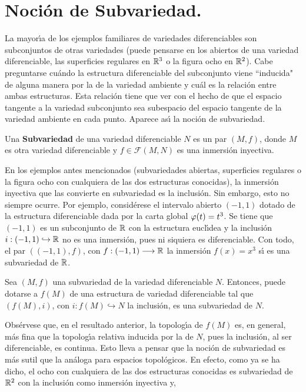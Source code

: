 \documentclass[cursovd_portada.tex]{subfiles}
\begin{document}
\section{Noci\'{o}n de Subvariedad.}
\hs La mayor\'{\i}a de los ejemplos familiares de variedades
diferenciables son subconjuntos de otras variedades (puede
pensarse en los abiertos de una variedad diferenciable, las
superficies re\-gu\-la\-res en $\mathbb{R}^3$ o la figura ocho en $\mathbb{R}^2$).
Cabe preguntarse cu\'{a}ndo la estructura diferenciable del
subconjunto viene ``inducida" de alguna manera por la de la
variedad ambiente y cu\'{a}l es la relaci\'{o}n entre ambas
estructuras. Esta relaci\'{o}n tiene que ver con el hecho de que
el espacio tangente a la variedad subconjunto sea subespacio del
espacio tangente de la variedad ambiente en cada punto. Aparece
as\'{\i} la noci\'{o}n de subvariedad.
\begin{defi}
Una {\bf Subvariedad} de una variedad diferenciable $N$ es un par $(M,f)$, donde $M$ es otra variedad
diferenciable y $f\in\mathcal{F}(M,N)$ es una inmersi\'{o}n inyectiva.
\end{defi}
En los ejemplos antes mencionados (subvariedades abiertas,
superficies re\-gu\-la\-res o la figura ocho con cualquiera de las
dos estructuras conocidas), la inmersi\'{o}n inyectiva que las
convierte en subvariedad es la inclusi\'{o}n. Sin embargo, esto no
siempre ocurre. Por ejemplo, consid\'{e}rese el intervalo abierto
$(-1,1)$ dotado de la estructura diferenciable dada por la carta
global $\varphi(t)=t^3$. Se tiene que $(-1,1)$ es un subconjunto de
$\mathbb{R}$ con la estructura eucl\'{\i}dea y la inclusi\'{o}n
$i:(-1,1)\hookrightarrow\mathbb{R}$ no es una inmersi\'{o}n, pues ni
siquiera es diferenciable. Con todo, el par $((-1,1),f)$, con
$f:(-1,1)\longrightarrow\mathbb{R}$ la inmersi\'{o}n $f(x)=x^3$ s\'{\i} es una
subvariedad de $\mathbb{R}$.
\begin{prop}\label{prop}
Sea $(M,f)$ una subvariedad de la variedad diferenciable $N$.
Entonces, puede dotarse a $f(M)$ de una estructura de variedad
diferenciable tal que $(f(M),i)$, con $i:f(M)\hookrightarrow N$ la
inclusi\'{o}n, es una subvariedad de $N$.
\end{prop}
Obs\'{e}rvese que, en el resultado anterior, la topolog\'{\i}a de $f(M)$ es, en general, m\'{a}s fina que la topolog\'{\i}a relativa
inducida por la de $N$, pues la inclusi\'{o}n, al ser diferenciable, es continua. Esto lleva a pensar que la noci\'{o}n de
subvariedad es m\'{a}s sutil que la an\'{a}loga para espacios topol\'{o}gicos. En efecto, como ya se ha dicho, el ocho con
cualquiera de las dos estructuras conocidas es subvariedad de $\mathbb{R}^2$ con la inclusi\'{o}n como inmersi\'{o}n inyectiva y,
\end{document}
